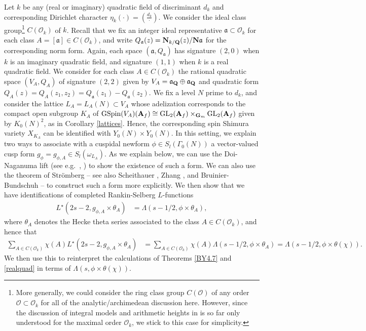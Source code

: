 \documentclass{amsart}
\theoremstyle{definition}
\theoremstyle{definition}
\theoremstyle{definition}
\begin{document}
Let $k$ be any (real or imaginary) quadratic field of discriminant $d_k$ and corresponding Dirichlet character 
$\eta_k(\cdot) = \left( \frac{d_k}{\cdot} \right)$. We consider the ideal class group\footnote{More generally,
we could consider the ring class group $C(\mathcal{O})$ of any order $\mathcal{O} \subset \mathcal{O}_k$ 
for all of the analytic/archimedean discussion here. However, since the discussion of integral models and arithmetic 
heights in \cite{AGHMP} is so far only understood for the maximal order $\mathcal{O}_k$, we stick to this case for simplicity.} 
$C(\mathcal{O}_k)$ of $k$. 
Recall that we fix an integer ideal representative $\mathfrak{a} \subset \mathcal{O}_k$ for each class
$A = [\mathfrak{a}] \in C(\mathcal{O}_k)$, and write $Q_{\mathfrak{a}}(z) = {\bf{N}}_{k/{\bf{Q}}}(z)/{\bf{N}} \mathfrak{a}$ 
for the corresponding norm form. Again, each space $(\mathfrak{a}, Q_{\mathfrak{a}})$ has signature $(2,0)$
when $k$ is an imaginary quadratic field, and signature $(1,1)$ when $k$ is a real quadratic field. 
We consider for each class $A \in C(\mathcal{O}_k)$ the rational quadratic space $(V_A, Q_A)$ of signature $(2,2)$
given by $V_A = \mathfrak{a}_{\bf{Q}} \oplus \mathfrak{a}_{\bf{Q}}$ and quadratic form 
$Q_A(z) = Q_A(z_1, z_2) = Q_{\mathfrak{a}}(z_1) - Q_{\mathfrak{a}}(z_2)$. We fix a level $N$ prime to $d_k$,
and consider the lattice $L_A = L_A(N)\subset V_A$ whose adelization corresponds
to the compact open subgroup $K_A$ of $\operatorname{GSpin}(V_A)({\bf{A}}_f) \cong  \operatorname{GL}_2({\bf{A}}_f) \times_{{\bf{G}}_m} \operatorname{GL}_2({\bf{A}}_f)$
given by $K_0(N)^2$, as in Corollary \ref{lattices}.
Hence, the corresponding spin Shimura variety $X_{K_A}$ can be identified with $Y_0(N) \times Y_0(N)$. 
In this setting, we explain two ways to associate with a cuspidal newform 
$\phi \in S_l(\Gamma_0(N))$ a vector-valued cusp form $g_{\phi} = g_{\phi, A} \in S_l(\omega_{L_A})$.
As we explain below, we can use the Doi-Naganuma lift (see e.g.~\cite[$\S 3.1$]{Br-123}, \cite{Za})
to show the existence of such a form. We can also use the theorem of Str\"omberg 
\cite[Theorem 5.4]{Str} -- see also Scheithauer \cite[Theorem 3.1]{Scheit}, 
Zhang \cite[Theorem 4.15]{YZ}, and Bruinier-Bundschuh \cite{BB} -- to construct such a form more explicitly. 
We then show that we have identifications of completed Rankin-Selberg $L$-functions 
\begin{align}\label{E1} L^{\star}(2s-2, g_{\phi, A} \times \theta_A) &= \Lambda(s-1/2, \phi \times \theta_A),\end{align}
where $\theta_A$ denotes the Hecke theta series associated to the class $A \in C(\mathcal{O}_k)$, and hence that 
\begin{align}\label{E2} \sum\limits_{A \in C(\mathcal{O}_k)} \chi(A)
L^{\star}(2s-2, g_{\phi, A} \times \theta_A) &= 
\sum\limits_{A \in C(\mathcal{O}_k)} \chi(A) \Lambda(s-1/2, \phi \times \theta_A)= \Lambda(s-1/2, \phi \times \theta(\chi)).\end{align}
We then use this to reinterpret the calculations of Theorems \ref{BY4.7} and \ref{realquad} in terms of $\Lambda(s, \phi \times \theta(\chi))$.
\end{document}
